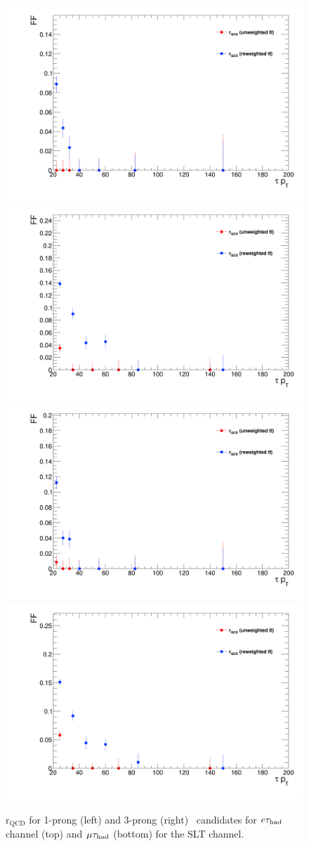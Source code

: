\begin{figure}[htbp]
\centering
\includegraphics[width=.4\textwidth]{DiHiggs/plots/FF_CRs/SLTElecrQCD1p.png}
\includegraphics[width=.4\textwidth]{DiHiggs/plots/FF_CRs/SLTElecrQCD3p.png} \\
\includegraphics[width=.4\textwidth]{DiHiggs/plots/FF_CRs/SLTMuonrQCD1p.png}
\includegraphics[width=.4\textwidth]{DiHiggs/plots/FF_CRs/SLTMuonrQCD3p.png}\\
\caption{$\mathrm{r}_{\mathrm{QCD}}$ for 1-prong (left) and 3-prong (right) \tauhad\ candidates for $e\tau_{\mathrm{had}}$ channel (top) and $\mu\tau_{\mathrm{had}}$ (bottom)
for the SLT channel.}
\label{fig:SLT_rQCD}
\end{figure}


